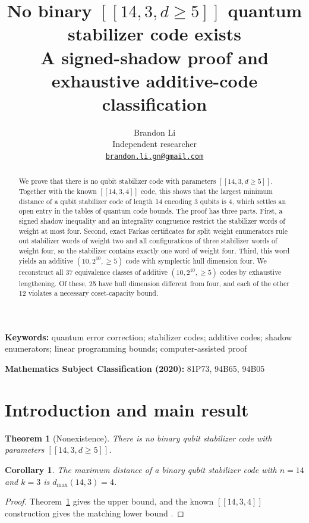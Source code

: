 \documentclass[11pt]{article}
\title{No binary \(\left[\!\left[14,3,d\geq 5\right]\!\right]\) quantum stabilizer code exists\\[0.7em]
\large\mdseries A signed-shadow proof and exhaustive additive-code classification}
\author{Brandon Li\\[0.3em]
\normalsize Independent researcher\\
\normalsize\href{mailto:brandon.li.gn@gmail.com}{\texttt{brandon.li.gn@gmail.com}}}
\date{}
\newtheorem{theorem}{Theorem}
\newtheorem*{corollary*}{Corollary}
\begin{document}
\maketitle
\begin{abstract}
We prove that there is no qubit stabilizer code with parameters
\(\left[\!\left[14,3,d\geq5\right]\!\right]\). Together with the known
\(\left[\!\left[14,3,4\right]\!\right]\) code, this shows that the
largest minimum distance of a qubit stabilizer code of length 14
encoding 3 qubits is 4, which settles an open entry in the tables of
quantum code bounds. The proof has three parts. First, a signed shadow
inequality and an integrality congruence restrict the stabilizer words
of weight at most four. Second, exact Farkas certificates for split
weight enumerators rule out stabilizer words of weight two and all
configurations of three stabilizer words of weight four, so the
stabilizer contains exactly one word of weight four. Third, this word
yields an additive \((10,2^{10},\geq5)\) code with symplectic hull
dimension four. We reconstruct all 37 equivalence classes of additive
\((10,2^{10},\geq5)\) codes by exhaustive lengthening. Of these, 25
have hull dimension different from four, and each of the other 12
violates a necessary coset-capacity bound.
\end{abstract}

\noindent\textbf{Keywords:} quantum error correction; stabilizer codes; additive codes; shadow enumerators; linear programming bounds; computer-assisted proof

\noindent\textbf{Mathematics Subject Classification (2020):} 81P73, 94B65, 94B05

\section{Introduction and main result}\label{introduction-and-main-result}

\begin{theorem}[Nonexistence]\label{thm:main}
There is no binary qubit stabilizer code with parameters \(\left[\!\left[14,3,d\geq 5\right]\!\right]\).
\end{theorem}

\begin{corollary*}
The maximum distance of a binary qubit stabilizer code with \(n=14\) and \(k=3\) is \(d_{\max}(14,3)=4\).
\end{corollary*}
\begin{proof}
Theorem~\ref{thm:main} gives the upper bound, and the known
\(\left[\!\left[14,3,4\right]\!\right]\) construction gives the matching lower bound
\cite{grassl-table}.
\end{proof}
\end{document}
